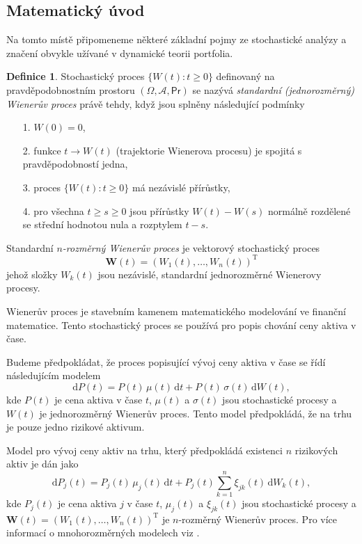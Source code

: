 \documentclass[a4paper,12pt]{report}
\theoremstyle{definition} \newtheorem{definice}[veta]{Definice}
\theoremstyle{remark}
\begin{document}
\subsection{Matematický úvod}
Na tomto místě připomeneme některé základní pojmy ze stochastické analýzy a značení obvykle užívané v dynamické teorii portfolia. 

\begin{definice}
Stochastický proces $\{W(t):t\ge0\}$ definovaný na pravděpodobnostním prostoru $(\Omega,\mathcal{A},\mathsf{Pr})$ se nazývá \textit{standardní (jednorozměrný) Wienerův proces} právě tehdy, když jsou splněny následující podmínky
\begin{enumerate}
\item[1.]$W(0)=0$, 
\item[2.]funkce $t\to W(t)$ (trajektorie Wienerova procesu) je spojitá s pravděpodobností jedna,
\item[3.]proces $\{W(t):t\ge0\}$ má nezávislé přírůstky, 
\item[4.]pro všechna $t\ge s\ge0$ jsou přírůstky $W(t)-W(s)$ normálně rozdělené se střední hodnotou nula a rozptylem $t-s$.
\end{enumerate}
Standardní \textit{$n$-rozměrný Wienerův proces} je vektorový stochastický proces
$$\boldsymbol{W}(t) = (W_1(t), \dots, W_n(t))^\mathrm{T}$$
jehož složky $W_k(t)$ jsou nezávislé, standardní jednorozměrné Wienerovy procesy.
\end{definice}
Wienerův proces je stavebním kamenem matematického modelování ve finanční matematice. 
Tento stochastický proces se používá pro popis chování ceny aktiva v čase. 

Budeme předpokládat, že proces popisující vývoj ceny aktiva v čase se řídí následujícím modelem
$$\mathrm{d}P(t)=P(t)\,\mu(t)\,\mathrm{d}t+P(t)\,\sigma(t)\,\mathrm{d}W(t),$$
kde $P(t)$ je cena aktiva v čase $t$, $\mu(t)$ a $\sigma(t)$ jsou stochastické procesy a $W(t)$  je jednorozměrný Wienerův proces.
Tento model předpokládá, že na trhu je pouze jedno rizikové aktivum.

Model pro vývoj ceny aktiv na trhu, který předpokládá existenci $n$ rizikových aktiv je dán jako
$$\mathrm{d}P_j(t)=P_j(t)\,\mu_j(t)\,\mathrm{d}t+P_j(t)\sum_{k=1}^{n}\xi_{jk}(t)\,\mathrm{d}W_k(t),$$
kde $P_j(t)$ je cena aktiva $j$ v čase $t$, $\mu_j(t)$ a $\xi_{jk}(t)$ jsou stochastické procesy a $\boldsymbol{W}(t)=(W_1(t),\dots,W_n(t))^\mathrm{T}$ je $n$-rozměrný Wienerův proces. 
Pro více informací o mnohorozměrných modelech viz \cite{etheridge2002course}.
\end{document}
